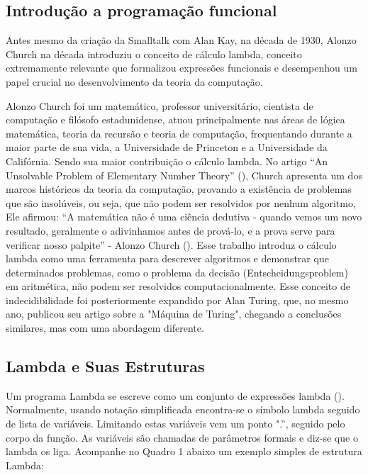 \subsection{Introdução a programação funcional}

Antes mesmo da criação da Smalltalk com Alan Kay, na década de 1930, Alonzo Church na década introduziu o conceito de cálculo lambda, conceito extremamente relevante que formalizou expressões funcionais e desempenhou um papel crucial no desenvolvimento da teoria da computação.

 Alonzo Church foi um matemático, professor universitário, cientista de computação e filósofo estadunidense, atuou principalmente nas áreas de lógica matemática, teoria da recursão e teoria de computação, frequentando durante a maior parte de sua vida, a Universidade de Princeton e a Universidade da Califórnia. Sendo sua maior contribuição o cálculo lambda. No artigo “An Unsolvable Problem of Elementary Number Theory” (), Church apresenta um dos marcos históricos da teoria da computação, provando a existência de problemas que são insolúveis, ou seja, que não podem ser resolvidos por nenhum algoritmo, Ele afirmou: “A matemática não é uma ciência dedutiva - quando vemos um novo resultado, geralmente o adivinhamos antes de prová-lo, e a prova serve para verificar nosso palpite” - Alonzo Church (). Esse trabalho introduz o cálculo lambda como uma ferramenta para descrever algoritmos e demonstrar que determinados problemas, como o problema da decisão (Entscheidungsproblem) em aritmética, não podem ser resolvidos computacionalmente. Esse conceito de indecidibilidade foi posteriormente expandido por Alan Turing, que, no mesmo ano, publicou seu artigo sobre a "Máquina de Turing", chegando a conclusões similares, mas com uma abordagem diferente.

\subsection{Lambda e Suas Estruturas}

Um programa Lambda se escreve como um conjunto de expressões lambda (). Normalmente, usando notação simplificada encontra-se o símbolo lambda seguido de lista de variáveis. Limitando estas variáveis vem um ponto ".'', seguido pelo corpo da função. As variáveis são chamadas de parâmetros formais e diz-se que o lambda os liga. Acompanhe no Quadro 1 abaixo um exemplo simples de estrutura Lambda:

